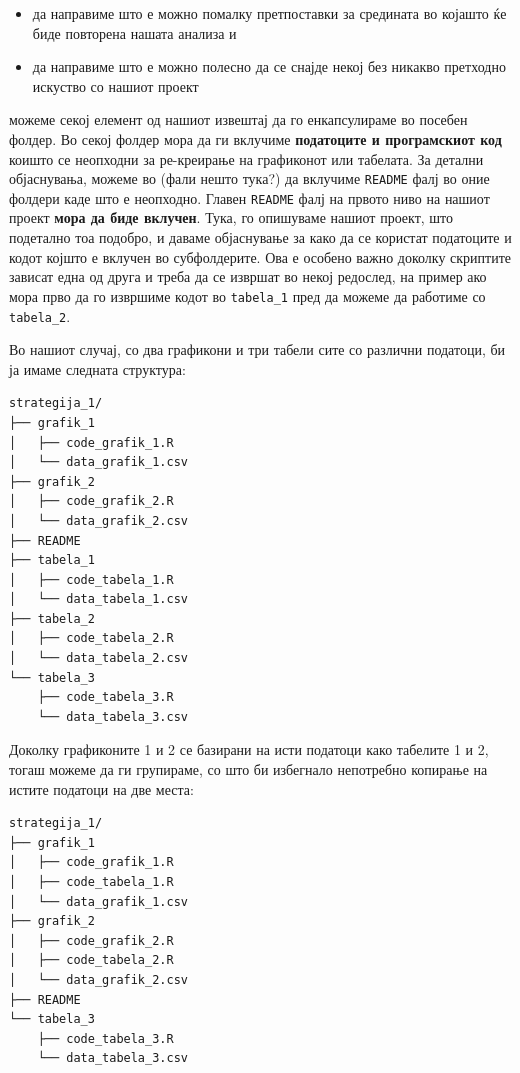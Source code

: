 \documentclass[
]{book}
\providecommand{\tightlist}{%
  \setlength{\itemsep}{0pt}\setlength{\parskip}{0pt}}
\begin{document}
\begin{itemize}
\tightlist
\item
  да направиме што е можно помалку претпоставки за средината во којашто ќе биде повторена нашата анализа и\\
\item
  да направиме што е можно полесно да се снајде некој без никакво претходно искуство со нашиот проект
\end{itemize}

можеме секој елемент од нашиот извештај да го енкапсулираме во посебен фолдер. Во секој фолдер мора да ги вклучиме \textbf{податоците и програмскиот код} коишто се неопходни за ре-креирање на графиконот или табелата. За детални објаснувања, можеме во (фали нешто тука?) да вклучиме \texttt{README} фалј во оние фолдери каде што е неопходно. Главен \texttt{README} фалј на првото ниво на нашиот проект \textbf{мора да биде вклучен}. Тука, го опишуваме нашиот проект, што подетално тоа подобро, и даваме објаснување за како да се користат податоците и кодот којшто е вклучен во субфолдерите. Ова е особено важно доколку скриптите зависат една од друга и треба да се извршат во некој редослед, на пример ако мора прво да го извршиме кодот во \texttt{tabela\_1} пред да можеме да работиме со \texttt{tabela\_2}.

Во нашиот случај, со два графикони и три табели сите со различни податоци, би ја имаме следната структура:

\begin{verbatim}
strategija_1/
├── grafik_1
│   ├── code_grafik_1.R
│   └── data_grafik_1.csv
├── grafik_2
│   ├── code_grafik_2.R
│   └── data_grafik_2.csv
├── README
├── tabela_1
│   ├── code_tabela_1.R
│   └── data_tabela_1.csv
├── tabela_2
│   ├── code_tabela_2.R
│   └── data_tabela_2.csv
└── tabela_3
    ├── code_tabela_3.R
    └── data_tabela_3.csv
\end{verbatim}

Доколку графиконите 1 и 2 се базирани на исти податоци како табелите 1 и 2, тогаш можеме да ги групираме, со што би избегнало непотребно копирање на истите податоци на две места:

\begin{verbatim}
strategija_1/
├── grafik_1
│   ├── code_grafik_1.R
│   ├── code_tabela_1.R
│   └── data_grafik_1.csv
├── grafik_2
│   ├── code_grafik_2.R
│   ├── code_tabela_2.R
│   └── data_grafik_2.csv
├── README
└── tabela_3
    ├── code_tabela_3.R
    └── data_tabela_3.csv
\end{verbatim}
\end{document}
